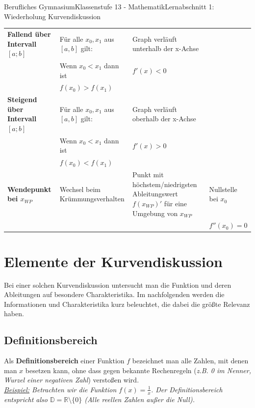 \documentclass[11pt,twocolumn,oneside,openany,headings=optiontotoc,11pt,numbers=noenddot]{article}
\begin{document}
\begin{worksheet}{Berufliches Gymnasium}{Klassenstufe 13 - Mathematik}{Lernabschnitt 1: Wiederholung Kurvendiskussion}
\begin{tabularx}{\textwidth}{|X|X|X|X|}
			\hline
			\textbf{Fallend über Intervall \([a;b]\)} & Für alle \(x_0, x_1\) aus \([a,b]\) gilt: & Graph verläuft unterhalb der x-Achse & \\
			& Wenn \(x_0 < x_1\) dann ist & \(f'(x) < 0\) & \\
			& \(f(x_0) > f(x_1)\) & & \\
			\hline
			\textbf{Steigend über Intervall \([a;b]\)} & Für alle \(x_0, x_1\) aus \([a,b]\) gilt: & Graph verläuft oberhalb der x-Achse &\\
			& Wenn \(x_0 < x_1\) dann ist & \(f'(x) > 0\) & \\
			& \(f(x_0) < f(x_1)\) & & \\
			\hline
			\textbf{Wendepunkt bei \(x_{WP}\)} & Wechsel beim Krümmungsverhalten & Punkt mit höchstem/niedrigsten Ableitungswert \(f(x_{WP})'\) für eine Umgebung von \(x_{WP}\) & Nullstelle bei \(x_0\)\\
			& & & \(f''(x_0) = 0\)\\
			\hline
		\end{tabularx}
		\par\bigskip\noindent
		\clearpage
		\setlength{\columnseprule}{0.1pt}
		\section{Elemente der Kurvendiskussion}
		Bei einer solchen Kurvendiskussion untersucht man die Funktion und deren Ableitungen auf besondere Charakteristika. Im nachfolgenden werden die Informationen und Charakteristika kurz beleuchtet, die dabei die größte Relevanz haben.
		\subsection{Definitionsbereich}
		Als \textbf{Definitionsbereich} einer Funktion \(f\) bezeichnet man alle Zahlen, mit denen man \(x\) besetzen kann, ohne dass gegen bekannte Rechenregeln (\textit{z.B. 0 im Nenner, Wurzel einer negativen Zahl}) verstoßen wird.\\
		\textit{\underline{Beispiel:} Betrachten wir die Funktion \(f(x) = \frac{1}{x}\). Der Definitionsbereich entspricht also \(\mathbb{D} = \mathbb{R}\setminus\{0\}\) (Alle reellen Zahlen außer die Null).}

\end{worksheet}
\end{document}
